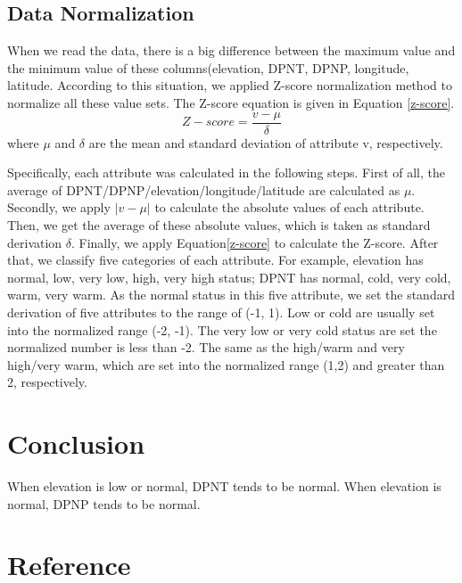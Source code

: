 \documentclass[11pt]{article}
\begin{document}
\subsection{Data Normalization}
When we read the data, there is a big difference between the maximum value and the minimum value of these columns(elevation, DPNT, DPNP, longitude, latitude. According to this situation, we applied Z-score normalization method to normalize all these value sets. The Z-score equation is given in Equation \eqref{z-score}.
\begin{equation}
Z-score = \frac{v-\mu}{\delta} \label{z-score}
\end{equation}
where $\mu$ and $\delta$ are the mean and standard deviation of attribute v, respectively. 

Specifically, each attribute was calculated in the following steps. First of all, the average of DPNT/DPNP/elevation/longitude/latitude are calculated as $\mu$. Secondly, we apply $|v-\mu|$ to calculate the absolute values of each attribute. Then, we get the average of these absolute values, which is taken as standard derivation $\delta$. Finally, we apply Equation\eqref{z-score} to calculate the Z-score. 
After that, we classify five categories of each attribute. For example, elevation has normal, low, very low, high, very high status; DPNT has normal, cold, very cold, warm, very warm. As the normal status in this five attribute, we set the standard derivation of five attributes to the range of (-1, 1). Low or cold are usually set into the normalized range (-2, -1). The very low or very cold status are set the normalized number is less than -2. The same as the high/warm and very high/very warm, which are set into the normalized range (1,2) and greater than 2, respectively. 

\section{Conclusion}
When elevation is low or normal, DPNT tends to be normal. When elevation is normal, DPNP tends to be normal. 

\section{Reference}


\end{document}
